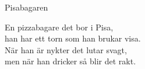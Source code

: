 \begin{song}{Pisabagaren}
	


	
	En pizzabagare det bor i Pisa,\\
	han har ett torn som han brukar visa.\\
	När han är nykter det lutar svagt,\\
	men när han dricker så blir det rakt.
	
\end{song}
